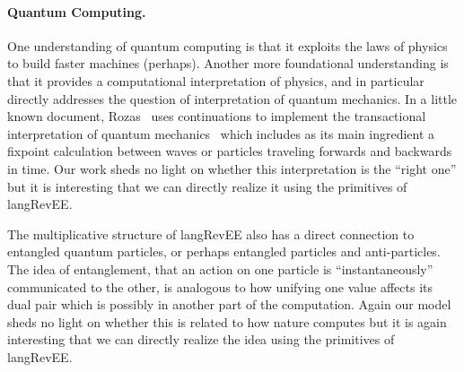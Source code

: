 \documentclass[preprint]{sigplanconf}
\begin{document}

\paragraph*{Quantum Computing.} 
One understanding of quantum computing is that it exploits the laws of physics
to build faster machines (perhaps). Another more foundational understanding
is that it provides a computational interpretation of physics, and in
particular directly addresses the question of interpretation of quantum
mechanics. In a little known document, Rozas~\cite{Rozas:1987:CMO:889539}
uses continuations to implement the transactional interpretation of quantum
mechanics~\cite{transactional} which includes as its main ingredient a
fixpoint calculation between waves or particles traveling forwards and
backwards in time. Our work sheds no light on whether this interpretation is
the ``right one'' but it is interesting that we can directly realize it using
the primitives of {{langRevEE}}. 


The multiplicative structure of {{langRevEE}} also has a direct
connection to entangled quantum particles, or perhaps entangled
particles and anti-particles.  The idea of entanglement, that an
action on one particle is ``instantaneously'' communicated to the
other, is analogous to how unifying one value affects its dual pair
which is possibly in another part of the computation.  Again our model
sheds no light on whether this is related to how nature computes but
it is again interesting that we can directly realize the idea using
the primitives of {{langRevEE}}.
\end{document}

